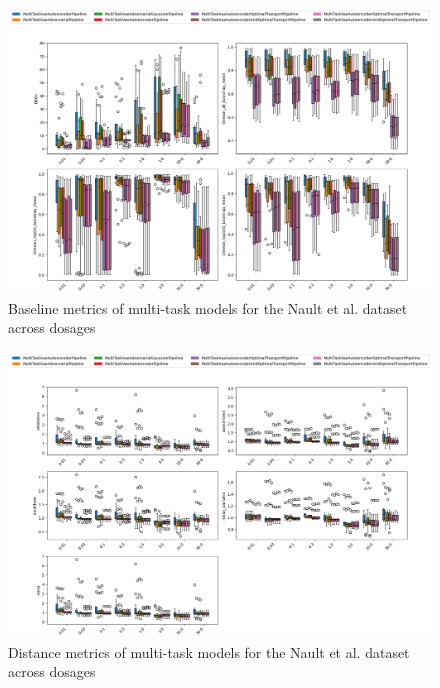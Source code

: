 \documentclass[12pt, a4paper]{article}
\begin{document}
\begin{figure}[h!]
    \centering
    \includegraphics[width=\textwidth]{multi_task_benchmarking_doses_baseline_metrics.png}
    \caption{Baseline metrics of multi-task models for the Nault et al. \cite{nault2021single,nault2022benchmarking} dataset across dosages}
\end{figure}

\begin{figure}[h!]
    \centering
    \includegraphics[width=\textwidth]{multi_task_benchmarking_doses_distance_metrics.png}
    \caption{Distance metrics of multi-task models for the Nault et al. \cite{nault2021single,nault2022benchmarking} dataset across dosages}
\end{figure}
\end{document}
